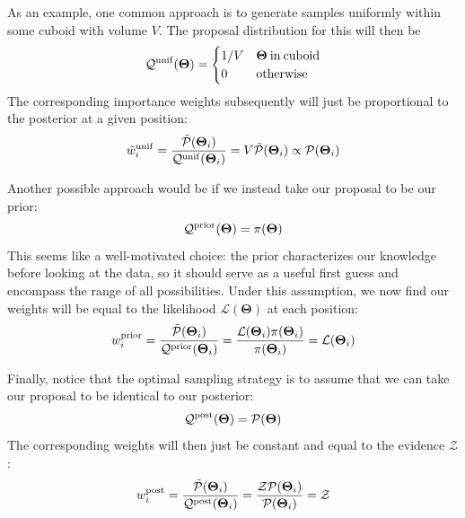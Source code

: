 \documentclass[12pt, titlepage]{article}
\newcommand{\params}{\ensuremath{\boldsymbol\Theta}}
\newcommand{\likelihood}{\ensuremath{\mathcal{L}}}
\newcommand{\prior}{\ensuremath{\pi}}
\newcommand{\posterior}{\ensuremath{\mathcal{P}}}
\newcommand{\proposal}{\ensuremath{\mathcal{Q}}}
\newcommand{\evidence}{\ensuremath{\mathcal{Z}}}
\begin{document}
As an example, one common approach is to generate samples uniformly within some 
cuboid with volume $V$. The proposal distribution for this
will then be
\begin{equation}
    \proposal^{\rm unif}(\params) =
    \begin{cases}
    1/V & \params \: {\rm in\:cuboid} \\
    0 & {\rm otherwise}
    \end{cases}
\end{equation}
The corresponding importance weights subsequently will
just be proportional to the posterior at a given position:
\begin{equation}
    \tilde{w}_i^{\rm unif}
    = \frac{\tilde{\posterior}(\params_i)}{\proposal^{\rm unif}(\params_i)}
    = V \tilde{\posterior}(\params_i)
    \propto \posterior(\params_i)
\end{equation}

Another possible approach would be if we instead take our proposal
to be our prior:
\begin{equation}
    \proposal^{\rm prior}(\params) = \prior(\params)
\end{equation}
This seems like a well-motivated choice: the prior characterizes
our knowledge before looking at the data, so it should serve
as a useful first guess and encompass the range of all possibilities.
Under this assumption, we now find our weights will be 
equal to the likelihood $\likelihood(\params)$ at each position:
\begin{equation}
    w_i^{\rm prior} 
    = \frac{\tilde{\posterior}(\params_i)}{\proposal^{\rm prior}(\params_i)}
    = \frac{\likelihood(\params_i) \prior(\params_i)}{\prior(\params_i)}
    = \likelihood(\params_i)
\end{equation}

Finally, notice that the optimal sampling strategy is to
assume that we can take our proposal to be identical to our
posterior:
\begin{equation}
    \proposal^{\rm post}(\params) = \posterior(\params)
\end{equation}
The corresponding weights will then just be constant and
equal to the evidence $\evidence$:
\begin{equation}
    w_i^{\rm post} 
    = \frac{\tilde{\posterior}(\params_i)}{\proposal^{\rm post}(\params_i)}
    = \frac{\evidence \posterior(\params_i)}{\posterior(\params_i)}
    = \evidence
\end{equation}
\end{document}
